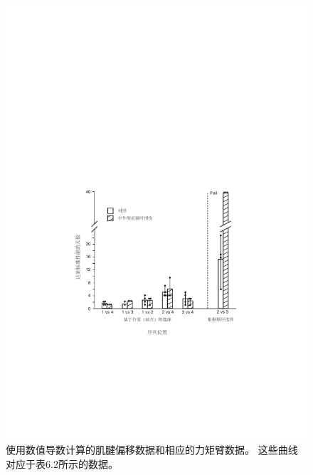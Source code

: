 \begin{figure}[!htb]
	\centering
	\includegraphics[width=1.0\linewidth]{chap6/6_5}
	\caption{使用数值导数计算的肌腱偏移数据和相应的力矩臂数据。
		这些曲线对应于表6.2所示的数据。 \label{fig:6_5}}
\end{figure}


